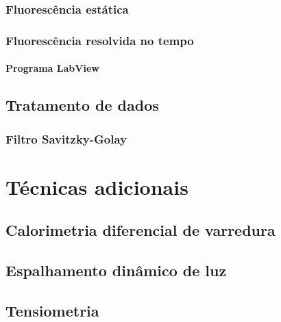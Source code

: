 			\subsection{Fluorescência estática}
			\subsection{Fluorescência resolvida no tempo}
				\subsubsection{Programa LabView}
		\section{Tratamento de dados}
			\subsection{Filtro Savitzky-Golay}
	\chapter{Técnicas adicionais}
		\section{Calorimetria diferencial de varredura}
		\section{Espalhamento dinâmico de luz}
		\section{Tensiometria}